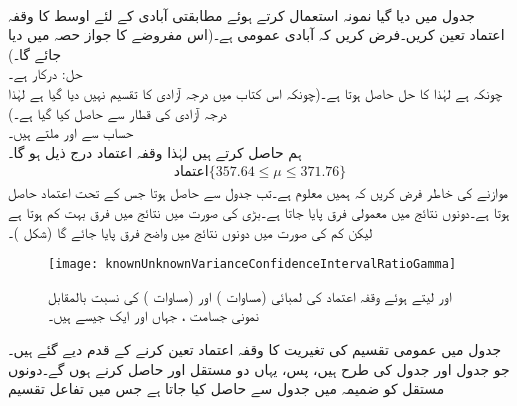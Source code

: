 \quad {}\\
جدول  میں دیا گیا نمونہ استعمال کرتے ہوئے  مطابقتی آبادی کے لئے اوسط  کا  وقفہ اعتماد تعین کریں۔فرض کریں کہ آبادی عمومی ہے۔(اس مفروضے کا جواز  حصہ  میں دیا جائے گا۔)\\
حل:\quad
{}\quad
{} درکار ہے۔\\
\quad
چونکہ  ہے لہٰذا   کا حل  حاصل ہوتا ہے۔(چونکہ اس کتاب میں  درجہ آزادی کا تقسیم نہیں دیا گیا ہے لہٰذا  درجہ آزادی کی قطار سے  حاصل کیا گیا ہے۔)\\
\quad
حساب سے  اور  ملتے ہیں۔\\
 \quad
ہم  حاصل کرتے ہیں لہٰذا وقفہ اعتماد درج ذیل ہو گا۔
\begin{align*}
\text{اعتماد}\{357.64\le \mu\le 371.76\}
\end{align*}
موازنے کی خاطر فرض کریں کہ ہمیں  معلوم ہے۔تب جدول  سے
  حاصل ہوتا جس کے تحت   اعتماد حاصل ہوتا ہے۔دونوں نتائج میں معمولی فرق پایا جاتا ہے۔بڑی  کی صورت میں نتائج میں فرق بہت کم ہوتا ہے لیکن کم  کی صورت میں دونوں نتائج میں واضح فرق پایا جائے گا (شکل )۔
\begin{figure}
\centering
\texttt{[image: knownUnknownVarianceConfidenceIntervalRatioGamma]}
\caption{
 اور  لیتے ہوئے وقفہ اعتماد کی لمبائی  (مساوات ) اور  (مساوات ) کی نسبت بالمقابل نمونی جسامت ، جہاں  اور  ایک جیسے ہیں۔ 
}
\label{شکل_مثال_شماریات_ٹی_تقسیم_وقفہ_اعتماد}
\end{figure}
جدول  میں عمومی تقسیم کی تغیریت کا وقفہ اعتماد تعین کرنے کے قدم دیے گئے ہیں۔ جو جدول  اور جدول  کی طرح ہیں، پس، یہاں دو مستقل  اور  حاصل کرنے ہوں گے۔دونوں مستقل  کو ضمیمہ  میں جدول  سے حاصل کیا جاتا ہے جس میں تفاعل تقسیم
